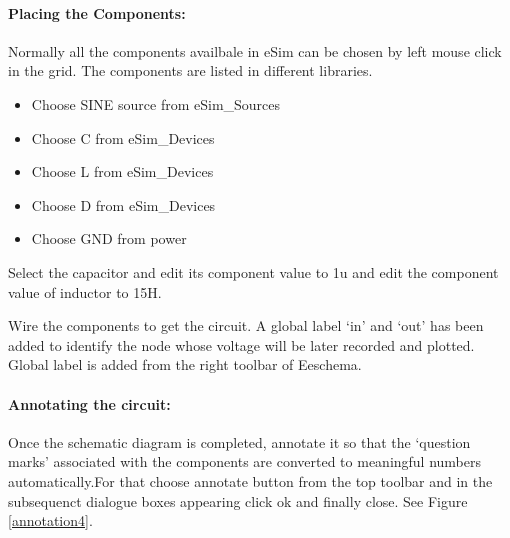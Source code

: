 \paragraph{Placing the Components:} Normally all the components availbale in eSim can be chosen by left mouse click in the grid. The components are listed in different libraries. %


\begin{itemize}
\item
Choose SINE source from eSim\_Sources
\item
Choose C from eSim\_Devices
\item
Choose L from eSim\_Devices
\item
Choose D from eSim\_Devices
\item
Choose GND from power
\end{itemize}

Select the capacitor and edit its component value to 1u and edit the component value of inductor to 15H.%


Wire the components to get the circuit. A global label `in'  and `out' has been added to identify the node whose voltage will be later recorded and plotted. Global label is added from the right toolbar of Eeschema.

\paragraph{Annotating the circuit:} Once the schematic diagram is completed, annotate it so that the `question marks' associated with the components are converted to meaningful numbers automatically.For that choose annotate button from the top toolbar and in the subsequenct dialogue boxes appearing click ok and finally close. See Figure \ref{annotation4}.




